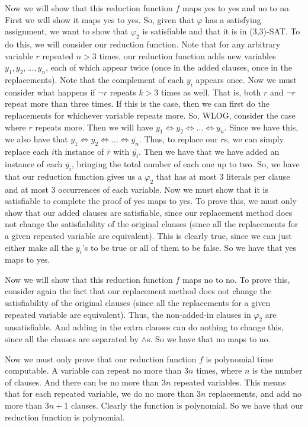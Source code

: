 \documentclass{article}
\begin{document}
Now we will show that this reduction function $f$ maps yes to yes and no
to no. First we will show it maps yes to yes. So, given that $\varphi$ has a
satisfying assignment, we want to show that $\varphi_{2}$ is satisfiable
and that it is in (3,3)-SAT. To do this, we will consider our reduction
function. Note that for any arbitrary variable $r$ repeated $n > 3$ times, our
reduction function adds new variables $y_{1}, y_{2}, \dots , y_{n}$, each of
which appear twice (once in the added clauses, once in the replacements).
Note that the complement of each $y_{i}$ appears once. Now
we must consider what happens if $\neg r$ repeats $k > 3$ times as well. That
is, both $r$ and $\neg r$ repeat more than three times. If this is the case,
then we can first do the replacements for whichever variable repeats more.
So, WLOG, consider the case where $r$ repeats more. Then we will have
$y_{1} \Leftrightarrow y_{2} \Leftrightarrow \dots \Leftrightarrow y_{n}$.
Since we have this, we also have that $\overline{y_{1}} \Leftrightarrow
\overline{y_{2}} \Leftrightarrow \dots \Leftrightarrow \overline{y_{n}}$. Thus,
to replace our $\overline{r}$s, we can simply replace each $i$th instance
of $\overline{r}$ with $\overline{y_{i}}$. Then we have that we have added
an instance of each $\overline{y_{i}}$, bringing the total number of each one
up to two. So, we have that our reduction function gives us a $\varphi_{2}$
that has at most 3 literals per clause and at most 3 occurrences of each
variable. Now we must show that it is satisfiable to complete the proof of
yes maps to yes. To prove this, we must only show that our added clauses
are satisfiable, since our replacement method does not change the
satisfiability of the original clauses (since all the replacements for a
given repeated variable are equivalent). This is clearly true, since we can
just either make all the $y_{i}$'s to be true or all of them to be false.
So we have that yes maps to yes.

Now we will show that this reduction function $f$ maps no to no. To prove this,
consider again the fact that our replacement method does not change the
satisfiability of the original clauses (since all the replacements for a given
repeated variable are equivalent). Thus, the non-added-in clauses in
$\varphi_{2}$ are unsatisfiable. And adding in the extra clauses can do nothing
to change this, since all the clauses are separated by $\wedge$s. So we have
that no maps to no.

Now we must only prove that our reduction function $f$ is polynomial time
computable. A variable can repeat no more than $3n$ times, where $n$ is the number
of clauses. And there can be no more than $3n$ repeated variables. This means
that for each repeated variable, we do no more than $3n$ replacements, and
add no more than $3n + 1$ clauses. Clearly the function is polynomial.
So we have that our reduction function is polynomial.
\newpage
\end{document}
